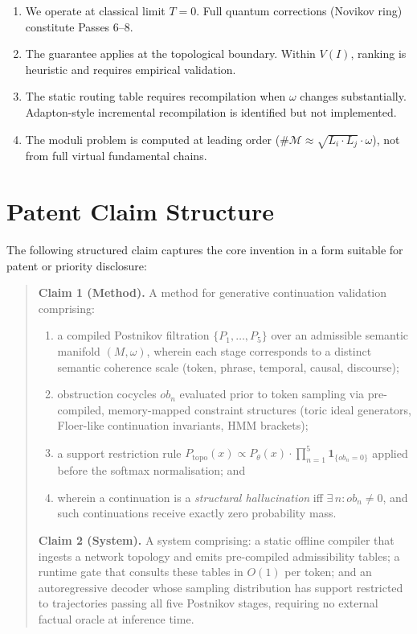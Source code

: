 \documentclass[11pt,a4paper]{article}
\begin{document}
\begin{enumerate}[label=(\roman*)]
  \item We operate at classical limit $T=0$. Full quantum
        corrections (Novikov ring) constitute Passes 6--8.
  \item The guarantee applies at the topological boundary.
        Within $V(I)$, ranking is heuristic and requires
        empirical validation.
  \item The static routing table requires recompilation when
        $\omega$ changes substantially. Adapton-style incremental
        recompilation is identified but not implemented.
  \item The moduli problem is computed at leading order
        ($\#\mathcal{M} \approx \sqrt{L_i \cdot L_j}\cdot\omega$),
        not from full virtual fundamental chains.
\end{enumerate}

\section{Patent Claim Structure}
\label{sec:patent}

The following structured claim captures the core invention
in a form suitable for patent or priority disclosure:

\begin{quote}
\textbf{Claim 1 (Method).}
A method for generative continuation validation comprising:
\begin{enumerate}[label=(\alph*)]
  \item a compiled Postnikov filtration
        $\{P_1,\ldots,P_5\}$ over an admissible semantic manifold
        $(M,\omega)$, wherein each stage corresponds to a distinct
        semantic coherence scale (token, phrase, temporal, causal,
        discourse);
  \item obstruction cocycles $ob_n$ evaluated prior to token
        sampling via pre-compiled, memory-mapped constraint
        structures (toric ideal generators, Floer-like continuation
        invariants, HMM brackets);
  \item a support restriction rule
        $P_{\mathrm{topo}}(x) \propto P_\theta(x)
        \cdot \prod_{n=1}^{5}\mathbf{1}_{\{ob_n=0\}}$
        applied before the softmax normalisation; and
  \item wherein a continuation is a \emph{structural hallucination}
        iff $\exists\,n: ob_n \neq 0$, and such continuations
        receive exactly zero probability mass.
\end{enumerate}

\textbf{Claim 2 (System).}
A system comprising: a static offline compiler that ingests a
network topology and emits pre-compiled admissibility tables;
a runtime gate that consults these tables in $O(1)$ per token;
and an autoregressive decoder whose sampling distribution has
support restricted to trajectories passing all five Postnikov
stages, requiring no external factual oracle at inference time.
\end{quote}
\end{document}
